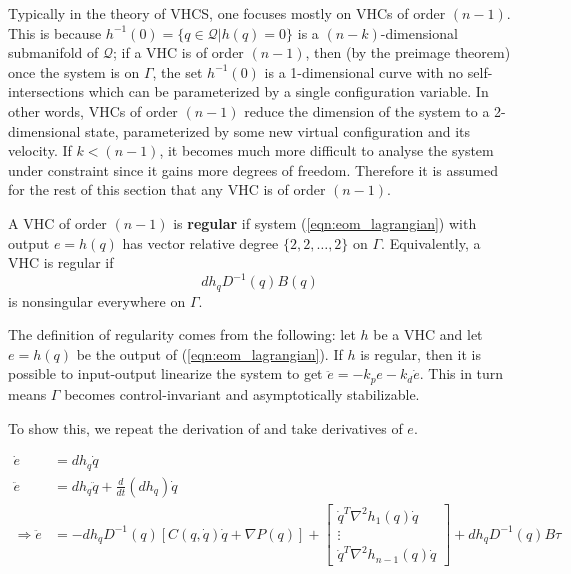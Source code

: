 Typically in the theory of VHCS, one focuses mostly on VHCs of order \((n-1)\).
This is because \(h^{-1}(0) = \{q \in \mathcal{Q} \vert h(q) = 0\}\) is a
\((n-k)\)-dimensional submanifold of \(\mathcal{Q}\); if a VHC is of order
\((n-1)\), then (by the preimage theorem) once the system is on \(\Gamma\), the
set \(h^{-1}(0)\) is a 1-dimensional curve with no self-intersections which can
be parameterized by a single configuration variable. In other words, VHCs of
order \((n-1)\) reduce the dimension of the system to a 2-dimensional state,
parameterized by some new virtual configuration and its velocity.  If \(k <
(n-1)\), it becomes much more difficult to analyse the system under constraint
since it gains more degrees of freedom. Therefore it is assumed for the rest of
this section that any VHC is of order \((n-1)\).

\begin{defn}\label{defn:vhc_regular}
   A VHC of order \((n-1)\) is \textbf{regular} if 
   system (\ref{eqn:eom_lagrangian}) with output \(e = h(q)\) has vector
   relative degree \(\{2,2,\ldots,2\}\) on \(\Gamma\).
   Equivalently, a VHC is regular if 
   \[
      dh_q D^{-1}(q)B(q)
   \]
   is nonsingular everywhere on \(\Gamma\).
\end{defn}

The definition of regularity comes from the following: 
let \(h\) be a VHC and let \(e = h(q)\) be the
output of (\ref{eqn:eom_lagrangian}). If \(h\) is regular, then
it is possible to input-output
linearize the system to get \(\ddot{e} = -k_p e - k_d \dot{e}\). This
in turn means \(\Gamma\) becomes control-invariant and asymptotically
stabilizable.

To show this, we repeat the derivation of
\textcite{vhcs_for_el_systems,lagrangian_structure_reduced_dynamics_vhcs} and take
derivatives of \(e\).

\begin{align*}
   \dot{e} &= dh_q \dot{q} \\
   \ddot{e} &= dh_q \ddot{q} + \frac{d}{dt}\left(dh_q\right)\dot{q}\\
   \Rightarrow \ddot{e} &= 
      -dh_qD^{-1}(q)\left[C(q,\dot{q})\dot{q} + \nabla P(q) \right] 
      + \begin{bmatrix}
         \dot{q}^T \nabla^2 h_1(q) \dot{q} \\
         \vdots \\
         \dot{q}^T \nabla^2 h_{n-1}(q) \dot{q}
      \end{bmatrix}
      + dh_q D^{-1}(q)B\tau \\
\end{align*}

